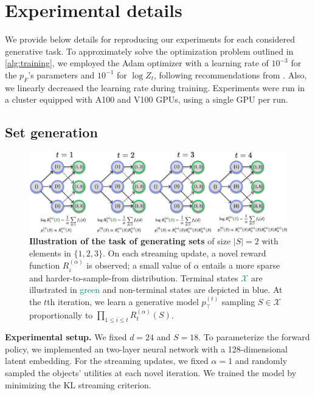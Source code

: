 \documentclass{article}
\newcommand{\pp}[1]{\vspace{0pt}\noindent\textbf{#1}}
\theoremstyle{plain}
\theoremstyle{definition}
\theoremstyle{remark}
\theoremstyle{remark}
\begin{document}
\section{Experimental details} \label{sec:app:experiments} 

We provide below details for reproducing our experiments for each considered generative task. To approximately solve the optimization problem outlined in \autoref{alg:training}, we employed the Adam optimizer \cite{kingma2014adam} with a learning rate of $10^{-3}$ for the $p_{F}$'s parameters and $10^{-1}$ for $\log Z_{t}$, following recommendations from \cite{malkin2022trajectory}. Also, we linearly decreased the learning rate during training. Experiments were run in a cluster equipped with A100 and V100 GPUs, using a single GPU per run.  


\subsection{Set generation} 

\begin{figure}[h!]
    \centering
    \includegraphics[width=.7\linewidth]{figures_rebuttal/diagram_compressed.pdf}
    \caption{\textbf{Illustration of the task of generating sets} of size $|S| = 2$ with elements in $\{1, 2, 3\}$. On each streaming update, a novel reward function $R_{i}^{(\alpha)}$ is observed; a small value of $\alpha$ entails a more sparse and harder-to-sample-from distribution. Terminal states \textcolor{teal}{$\mathcal{X}$} are illustrated in \textcolor{teal}{green} and non-terminal states are depicted in \textcolor{bleudefrance}{blue}. At the $t$th iteration, we learn a generative model $p_{\top}^{(t)}$ sampling $S \in \mathcal{X}$ proportionally to $\prod_{1 \le i \le t} R_{t}^{(\alpha)}(S)$. }
    \label{fig:setgenerations}
\end{figure}

\pp{Experimental setup.} We fixed $d = 24$ and $S = 18$. To parameterize the forward policy, we implemented an two-layer neural network with a 128-dimensional latent embedding. For the streaming updates, we fixed $\alpha = 1$ and randomly sampled the objects' utilities at each novel iteration. We trained the model by minimizing the KL streaming criterion. 
\end{document}

